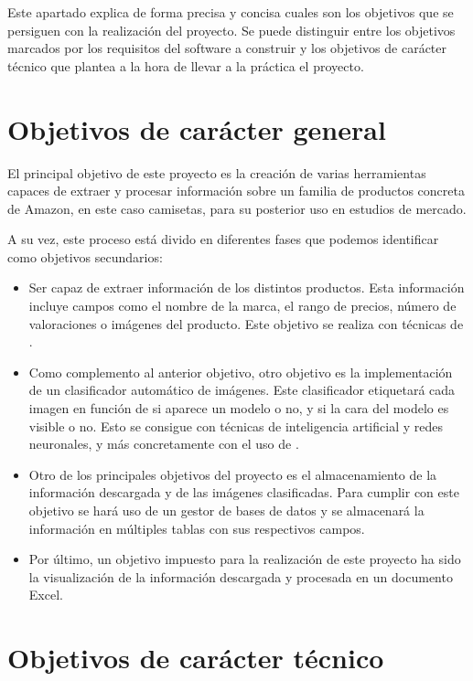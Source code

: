 
Este apartado explica de forma precisa y concisa cuales son los objetivos que se persiguen con la realización del proyecto. Se puede distinguir entre los objetivos marcados por los requisitos del software a construir y los objetivos de carácter técnico que plantea a la hora de llevar a la práctica el proyecto.

\section{Objetivos de carácter general}

El principal objetivo de este proyecto es la creación de varias herramientas capaces de extraer y procesar información sobre un familia de productos concreta de Amazon, en este caso camisetas, para su posterior uso en estudios de mercado.

A su vez, este proceso está divido en diferentes fases que podemos identificar como objetivos secundarios:

\begin{itemize}
	\item Ser capaz de extraer información de los distintos productos. Esta información incluye campos como el nombre de la marca, el rango de precios, número de valoraciones o imágenes del producto. Este objetivo se realiza con técnicas de .
	\item Como complemento al anterior objetivo, otro objetivo es la implementación de un clasificador automático de imágenes. Este clasificador etiquetará cada imagen en función de si aparece un modelo o no, y si la cara del modelo es visible o no. Esto se consigue con técnicas de inteligencia artificial y redes neuronales, y más concretamente con el uso de .
	\item Otro de los principales objetivos del proyecto es el almacenamiento de la información descargada y de las imágenes clasificadas. Para cumplir con este objetivo se hará uso de un gestor de bases de datos y se almacenará la información en múltiples tablas con sus respectivos campos.
	\item Por último, un objetivo impuesto para la realización de este proyecto ha sido la visualización de la información descargada y procesada en un documento Excel.
\end{itemize}

\section{Objetivos de carácter técnico}

